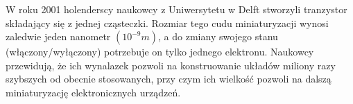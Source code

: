 \documentclass[a4paper,11pt]{article}
\begin{document}
W roku 2001 holenderscy naukowcy z Uniwersytetu w Delft stworzyli tranzystor składający się z jednej cząsteczki. Rozmiar tego cudu miniaturyzacji wynosi zaledwie jeden nanometr $(10^{-9} m)$, a do zmiany swojego stanu (włączony/wyłączony) potrzebuje on tylko jednego elektronu. Naukowcy przewidują, że ich wynalazek pozwoli na konstruowanie układów miliony razy szybszych od obecnie stosowanych, przy czym ich wielkość pozwoli na dalszą miniaturyzację elektronicznych urządzeń. 
 
\end{document}
